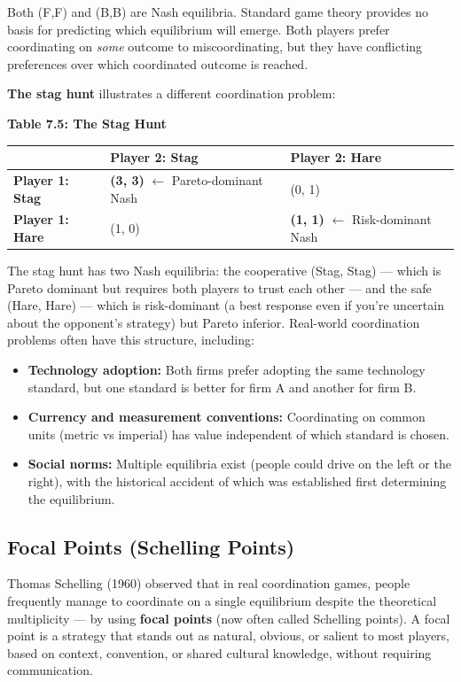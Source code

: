 \documentclass[12pt, letterpaper]{article}
\begin{document}
Both (F,F) and (B,B) are Nash equilibria. Standard game theory provides no basis for predicting which equilibrium will emerge. Both players prefer coordinating on \textit{some} outcome to miscoordinating, but they have conflicting preferences over which coordinated outcome is reached.

\textbf{The stag hunt} illustrates a different coordination problem:

\textbf{Table 7.5: The Stag Hunt}


\begin{table}[H]
\centering
\small
\begin{tabularx}{\linewidth}{lYY}
\toprule
 & Player 2: Stag & Player 2: Hare \\
\midrule
\textbf{Player 1: Stag} & \textbf{(3, 3)} $\leftarrow$ Pareto-dominant Nash & (0, 1) \\
\textbf{Player 1: Hare} & (1, 0) & \textbf{(1, 1)} $\leftarrow$ Risk-dominant Nash \\
\bottomrule
\end{tabularx}
\end{table}


The stag hunt has two Nash equilibria: the cooperative (Stag, Stag) --- which is Pareto dominant but requires both players to trust each other --- and the safe (Hare, Hare) --- which is risk-dominant (a best response even if you're uncertain about the opponent's strategy) but Pareto inferior. Real-world coordination problems often have this structure, including:

\begin{itemize}
\item \textbf{Technology adoption:} Both firms prefer adopting the same technology standard, but one standard is better for firm A and another for firm B.
\item \textbf{Currency and measurement conventions:} Coordinating on common units (metric vs imperial) has value independent of which standard is chosen.
\item \textbf{Social norms:} Multiple equilibria exist (people could drive on the left or the right), with the historical accident of which was established first determining the equilibrium.
\end{itemize}


\subsection{Focal Points (Schelling Points)}


Thomas Schelling (1960) observed that in real coordination games, people frequently manage to coordinate on a single equilibrium despite the theoretical multiplicity --- by using \textbf{focal points} (now often called Schelling points). A focal point is a strategy that stands out as natural, obvious, or salient to most players, based on context, convention, or shared cultural knowledge, without requiring communication.
\end{document}
